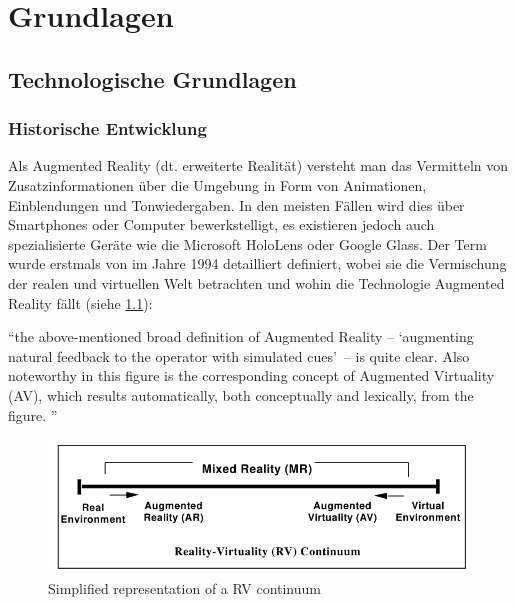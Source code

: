 \documentclass[a4paper]{scrreprt}
\begin{document}
\chapter{Grundlagen}
\label{ch:StandDerForschung}


\section{Technologische Grundlagen}

\subsection{Historische Entwicklung}
Als Augmented Reality (dt. erweiterte Realität) versteht man das Vermitteln von Zusatzinformationen über die Umgebung in Form von Animationen, Einblendungen und Tonwiedergaben. In den meisten Fällen wird dies über Smartphones oder Computer bewerkstelligt, es existieren jedoch auch spezialisierte Geräte wie die Microsoft HoloLens oder Google Glass. Der Term wurde erstmals von \citeauthor{Milgram1994} im Jahre 1994 detailliert definiert, wobei sie die Vermischung der realen und virtuellen Welt betrachten und wohin die Technologie Augmented Reality fällt (siehe \ref{fig:RVContiinum}):

\vspace{1em}

\textquotedblleft the above-mentioned broad definition of Augmented Reality –  \textquoteleft augmenting natural feedback to the operator with simulated cues\textquoteright\ – is quite clear. Also noteworthy in this figure is the corresponding concept of Augmented Virtuality (AV), which results automatically, both conceptually and lexically, from the figure. \textquotedblright\ \parencite{Milgram1994}

\begin{figure}[htb]
	\includegraphics[keepaspectratio, width=\textwidth]{MR_milgram.png}
	\caption{Simplified representation of a RV continuum \parencite{Milgram1994}}
	\label{fig:RVContiinum}
\end{figure}
\end{document}
